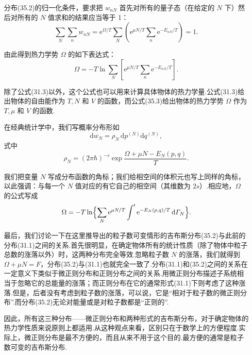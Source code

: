 分布(35.2)的归一化条件，要求把 $w_{nN}$ 首先对所有的量子态（在给定的 $N$ 下）然后对所有的 $N$ 值求和的结果应当等于 1：
\begin{equation*}
  \sum_N\sum_n w_{nN}=\mathrm{e}^{\Omega/T}\sum_N\left(\mathrm{e}^{\mu N/T}\sum_n\mathrm{e}^{-E_{nN}/T}\right)=1.
\end{equation*}

由此得到热力学势 $\Omega$ 的如下表达式：
\begin{equation}
  \Omega=-T\ln\sum_N\left[\mathrm{e}^{\mu N/T}\sum_n\mathrm{e}^{-E_{nN}/T}\right].
\end{equation}

除了公式(31.3)以外，这个公式也可以用来计算具体物体的热力学量.公式(31.3)给出物体的自由能作为 $T,N$ 和 $V$ 的函数，而公式(35.3)给出物体的热力学势 $\Omega$ 作为 $T,\mu$ 和 $V$ 的函数.

在经典统计学中，我们写概率分布形如
\begin{equation*}
  \mathrm{d}w_N=\rho_N\,\mathrm{d}p^{(N)}\mathrm{d}q^{(N)},
\end{equation*}
式中
\begin{equation}
  \rho_N=(2\pi\hbar)^{-s}\exp\frac{\Omega+\mu N-E_N(p,q)}{T}.
\end{equation}

我们把变量 $N$ 写成分布函数的角标；我们给相空间的体积元也写上同样的角标，以此强调：与每一个 $N$ 值对应的有它自己的相空间（其维数为 $2s$）.相应地，$\Omega$ 的公式写成
\begin{equation}
  \Omega=-T\ln\Bigl\{\sum_N\mathrm{e}^{\mu N/T}
  \int'\mathrm{e}^{-E_N(p,q)/T}\,\mathrm{d}\varGamma_N\Bigr\}.
\end{equation}

最后，我们讨论一下在这里推导出的粒子数可变情形的吉布斯分布(35.2)与此前的分布(31.1)之间的关系.首先很明显，在确定物体所有的统计性质（除了物体中粒子总数的涨落以外）时，这两种分布完全等效.忽略粒子数 $N$ 的涨落，我们就得到 $\Omega+\mu N=F$，分布(35.2)与(31.1)也就完全一致了.分布(31.1)和(35.2)之间的关系在一定意义下类似于微正则分布和正则分布之间的关系.用微正则分布描述子系统相当于忽略它的总能量的涨落；而正则分布在它的通常形式(31.1)下则考虑了这种涨落.但是，后者没有考虑到粒子数的涨落，可以说，它是“相对于粒子数的微正则分布”.而分布(35.2)无论对能量或是对粒子数都是“正则的”.

因此，所有这三种分布——微正则分布和两种形式的吉布斯分布，对于确定物体的热力学性质来说原则上都适用.从这种观点来看，区别只在于数学上的方便程度.实际上，微正则分布是最不方便的，而且从来不用于这个目的.最方便的通常是粒子数可变的吉布斯分布.

